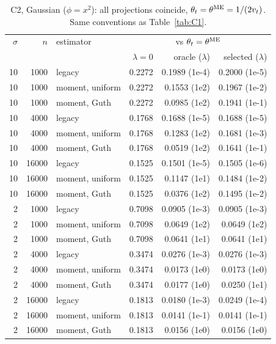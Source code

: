 \begin{table}[h]\centering\scriptsize
\begin{tabular}{@{}rrlrrr@{}}\toprule
$\sigma$ & $n$ & estimator & \multicolumn{3}{c}{vs $\theta_t=\theta^{\rm ME}$}\\
 & & & $\lambda{=}0$ & oracle ($\lambda$) & selected ($\lambda$)\\\midrule
10 & 1000 & legacy & 0.2272 & 0.1989 (1e-4) & 0.2000 (1e-5)\\
10 & 1000 & moment, uniform & 0.2272 & 0.1553 (1e2) & 0.1967 (1e-2)\\
10 & 1000 & moment, Guth & 0.2272 & 0.0985 (1e2) & 0.1941 (1e-1)\\
10 & 4000 & legacy & 0.1768 & 0.1688 (1e-5) & 0.1688 (1e-5)\\
10 & 4000 & moment, uniform & 0.1768 & 0.1283 (1e2) & 0.1681 (1e-3)\\
10 & 4000 & moment, Guth & 0.1768 & 0.0519 (1e2) & 0.1641 (1e-1)\\
10 & 16000 & legacy & 0.1525 & 0.1501 (1e-5) & 0.1505 (1e-6)\\
10 & 16000 & moment, uniform & 0.1525 & 0.1147 (1e1) & 0.1484 (1e-2)\\
10 & 16000 & moment, Guth & 0.1525 & 0.0376 (1e2) & 0.1495 (1e-2)\\
2 & 1000 & legacy & 0.7098 & 0.0905 (1e-3) & 0.0905 (1e-3)\\
2 & 1000 & moment, uniform & 0.7098 & 0.0649 (1e2) & 0.0649 (1e2)\\
2 & 1000 & moment, Guth & 0.7098 & 0.0641 (1e1) & 0.0641 (1e1)\\
2 & 4000 & legacy & 0.3474 & 0.0276 (1e-3) & 0.0276 (1e-3)\\
2 & 4000 & moment, uniform & 0.3474 & 0.0173 (1e0) & 0.0173 (1e0)\\
2 & 4000 & moment, Guth & 0.3474 & 0.0177 (1e0) & 0.0250 (1e1)\\
2 & 16000 & legacy & 0.1813 & 0.0180 (1e-3) & 0.0249 (1e-4)\\
2 & 16000 & moment, uniform & 0.1813 & 0.0141 (1e-1) & 0.0141 (1e-1)\\
2 & 16000 & moment, Guth & 0.1813 & 0.0156 (1e0) & 0.0156 (1e0)\\
\bottomrule\end{tabular}
\caption{C2, Gaussian ($\phi=x^2$): all projections coincide, $\theta_t=\theta^{\rm ME}=1/(2v_t)$. Same conventions as Table~\ref{tab:C1}.}\label{tab:C2}
\end{table}
